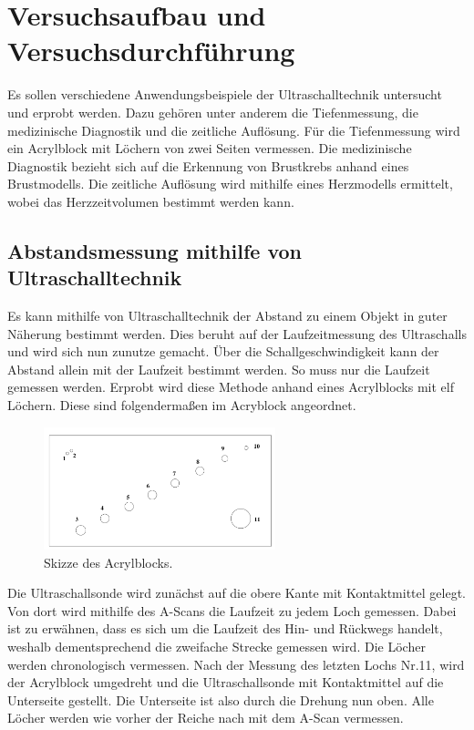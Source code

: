 %

%
\section{Versuchsaufbau und Versuchsdurchführung}
\label{sec:Durchfuehrung}

Es sollen verschiedene Anwendungsbeispiele der Ultraschalltechnik untersucht und erprobt werden.
Dazu gehören unter anderem die Tiefenmessung, die medizinische Diagnostik und die zeitliche Auflösung.
Für die Tiefenmessung wird ein Acrylblock mit Löchern von zwei Seiten vermessen. Die medizinische 
Diagnostik bezieht sich auf die Erkennung von Brustkrebs anhand eines Brustmodells. Die zeitliche 
Auflösung wird mithilfe eines Herzmodells ermittelt, wobei das Herzzeitvolumen bestimmt werden kann.

\subsection{Abstandsmessung mithilfe von Ultraschalltechnik}
Es kann mithilfe von Ultraschalltechnik der Abstand zu einem Objekt in guter Näherung bestimmt werden. 
Dies beruht auf der Laufzeitmessung des Ultraschalls und wird sich nun zunutze gemacht. Über die 
Schallgeschwindigkeit kann der Abstand allein mit der Laufzeit bestimmt werden. So muss nur die 
Laufzeit gemessen werden. Erprobt wird diese Methode anhand eines Acrylblocks mit elf Löchern. Diese 
sind folgendermaßen im Acryblock angeordnet.

\begin{figure}[H]
    \centering
    \includegraphics[width=0.6\textwidth]{content/Acrylblock.png}
    \caption{Skizze des Acrylblocks.}
    \label{fig:Acryblock}
\end{figure}

\noindent Die Ultraschallsonde wird zunächst auf die obere Kante mit Kontaktmittel gelegt. Von dort wird mithilfe 
des A-Scans die Laufzeit zu jedem Loch gemessen. Dabei ist zu erwähnen, dass es sich um die Laufzeit 
des Hin- und Rückwegs handelt, weshalb dementsprechend die zweifache Strecke gemessen wird. Die Löcher werden 
chronologisch vermessen. Nach der Messung des letzten Lochs Nr.11, wird der Acrylblock umgedreht 
und die Ultraschallsonde mit Kontaktmittel auf die Unterseite gestellt. Die Unterseite ist also durch 
die Drehung nun oben. Alle Löcher werden wie vorher der Reiche nach mit dem A-Scan vermessen. \\


